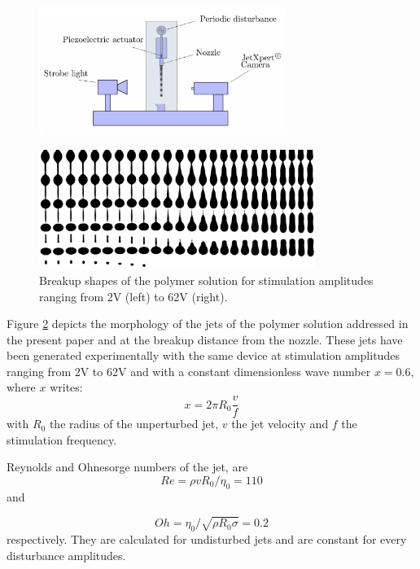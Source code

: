 \documentclass[twocolumn,10pt]{asme2ej}
\begin{document}
\begin{figure}[h]
    \centering
    \includegraphics[width=8cm]{device.png}
    \caption{}
    \label{device}
\end{figure}

\begin{figure}[t]
    \centering
    \includegraphics[width=0.8\textwidth]{Encre/expAll.png}
    \caption{Breakup shapes of the polymer solution for stimulation amplitudes ranging from 2V (left) to 62V (right).} 
    \label{fig:expAll}
\end{figure}

Figure \ref{fig:expAll} depicts the morphology of the jets of the polymer solution addressed in the present paper and at the breakup distance from the nozzle. These jets have been generated  experimentally with the same device at stimulation amplitudes ranging from 2V to 62V and with a constant dimensionless wave number $x = 0.6$, where $x$ writes:
\begin{equation}\label{eq:waveNbr}
    x=2 \pi R_0 \frac{v}{f}
\end{equation}
with $R_0$ the radius of the unperturbed jet, $v$ the jet velocity and $f$ the stimulation frequency. 

Reynolds and Ohnesorge numbers of the jet, are
\begin{equation}
    Re= \rho v R_0 / \eta_0 = 110
\end{equation} and 
   
\begin{equation}
    Oh=\eta_0/\sqrt{\rho R_0 \sigma} = 0.2
\end{equation}
respectively. They are calculated for undisturbed jets and are constant for every disturbance amplitudes.
\end{document}
